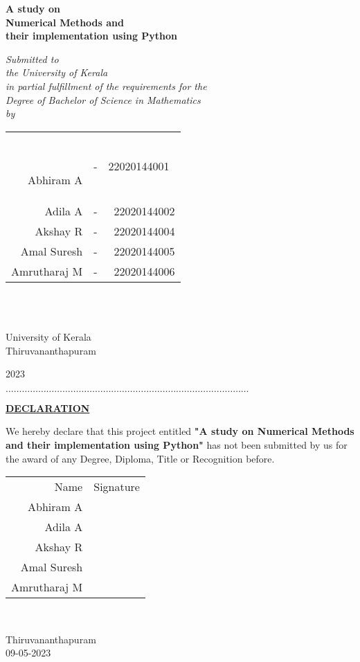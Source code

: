 \documentclass[12pt,a4paper,oneside]{book}
\begin{document}
	\begin{center}
		\bfseries{{\huge A study on}\\[.5cm]{\huge Numerical Methods {\huge and}}\\[.5cm] {\huge their implementation using Python}}
		
		\vspace{2cm}
		\emph{\large Submitted to\\
			the University of Kerala\\
			in partial fulfillment of the requirements for the\\[10pt]
			Degree of Bachelor of Science in Mathematics}\\[0.75cm]
		\emph{\Large by}\\[1.5cm]
		\large
		\begin{tabular}{rrr} 
			
			Abhiram A&-&22020144001 \\ 
			Adila A&-&22020144002\\ 
			Akshay R&-&22020144004\\
			Amal Suresh&-&22020144005\\
			Amrutharaj M&-&22020144006\\
		\end{tabular}\\[1cm]
		\bigskip 
		
		\vfill
		University of Kerala\\
		Thiruvananthapuram
		
		\vfill
		\Large 2023
	\end{center}
	\newpage
	
	\noindent$\dots \dots \dots \dots \dots \dots \dots \dots \dots \dots \dots \dots\dots \dots \dots \dots \dots \dots\dots \dots \dots \dots \dots \dots\dots \dots \dots \dots \dots \dots$
	
	\vspace{5cm}
	\begin{center}
		\bfseries\Large\underline{DECLARATION}
	\end{center}
	\vspace{1cm}
	We hereby declare that this project entitled \textbf{"A study on Numerical Methods and their implementation using Python"} has not been submitted by us for the award of any Degree, Diploma, Title or Recognition before.
	
	
	\begin{flushright}
		\begin{tabular}{rc} 
			Name& Signature\\[0.3cm]
			Abhiram A&\\[0.3cm]
			Adila A&\\[0.3cm]
			Akshay R&\\[0.3cm]
			Amal Suresh&\\[0.3cm]
			Amrutharaj M& \\
		\end{tabular}\\[1cm]
	\end{flushright}
	Thiruvananthapuram\\ 
	09-05-2023
	\newpage
	
\end{document}
